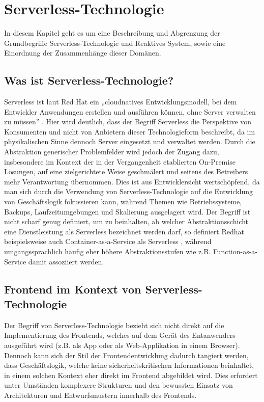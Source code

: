 \chapter{Serverless-Technologie}
\label{chap:serverless}

In diesem Kapitel geht es um eine Beschreibung und Abgrenzung der Grundbegriffe Serverless-Technologie und Reaktives System, sowie eine Einordnung der Zusammenhänge dieser Domänen.

\section{Was ist Serverless-Technologie?}
Serverless ist laut Red Hat ein „cloudnatives Entwicklungsmodell, bei dem Entwickler Anwendungen erstellen und ausführen können, ohne Server verwalten zu müssen” \cite{RedhatServerless}. Hier wird deutlich, dass der Begriff Serverless die Perspektive von Konsumenten und nicht von Anbietern dieser Technologieform beschreibt, da im physikalischen Sinne dennoch Server eingesetzt und verwaltet werden. Durch die Abstraktion generischer Problemfelder wird jedoch der Zugang dazu, insbesondere im Kontext der in der Vergangenheit etablierten On-Premise Lösungen, auf eine zielgerichtete Weise geschmälert und seitens des Betreibers mehr Verantwortung übernommen. Dies ist aus Entwicklersicht wertschöpfend, da man sich durch die Verwendung von Serverless-Technologie auf die Entwicklung von Geschäftslogik fokussieren kann, während Themen wie Betriebssysteme, Backups, Laufzeitumgebungen und Skalierung ausgelagert wird. Der Begriff ist nicht scharf genug definiert, um zu beinhalten, ab welcher Abstraktionsschicht eine Dienstleistung als Serverless bezeichnet werden darf, so definiert Redhat beispielsweise auch Container-as-a-Service als Serverless \cite{RedhatServerless}, während umgangssprachlich häufig eher höhere Abstraktionsstufen wie z.B. Function-as-a-Service damit assoziiert werden.

\section{Frontend im Kontext von Serverless-Technologie}
Der Begriff von Serverless-Technologie bezieht sich nicht direkt auf die Implementierung des Frontends, welches auf dem Gerät des Entanwenders ausgeführt wird (z.B. als App oder als Web-Applikation in einem Browser). Dennoch kann sich der Stil der Frontendentwicklung dadurch tangiert werden, dass Geschäftslogik, welche keine sicherheitskritischen Informationen beinhaltet, in einem solchen Kontext eher direkt im Frontend abgebildet wird. Dies erfordert unter Umständen komplexere Strukturen und den bewussten Einsatz von Architekturen und Entwurfsmustern innerhalb des Frontends.

